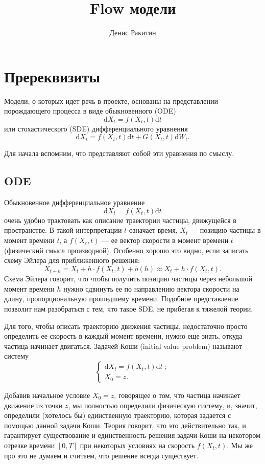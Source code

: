 \documentclass[12pt]{article}
\title{Flow модели}
\theoremstyle{definition}
\begin{document}
\author{Денис Ракитин}
\date{}
\maketitle
\tableofcontents
\newpage

\section{Пререквизиты}


Модели, о которых идет речь в проекте, основаны на представлении порождающего процесса в виде обыкновенного (ODE)
\[
    \mathrm{d} X_t = f(X_t, t) \mathrm{d} t
\]
или стохастического (SDE) дифференциального уравнения
\[
    \mathrm{d} X_t = f(X_t, t) \mathrm{d} t + G(X_t, t) \mathrm{d} W_t.
\]

Для начала вспомним, что представляют собой эти уравнения по смыслу. 

\subsection{ODE}
Обыкновенное дифференциальное уравнение 
\[
    \mathrm d X_t = f(X_t, t) \mathrm{d} t
\]
очень удобно трактовать как описание траектории частицы, движущейся в пространстве. В такой интерпретации $t$ означает время, $X_t$ --- позицию частицы в момент времени $t$, а $f(X_t, t)$ --- ее вектор скорости в момент времени $t$ (физический смысл производной). Особенно хорошо это видно, если записать схему Эйлера для приближенного решения:
\[
    X_{t + h} = X_t + h \cdot f(X_t, t) + \overline{o}(h) \approx X_t + h \cdot f(X_t, t).
\]
Схема Эйлера говорит, что чтобы получить позицию частицы через небольшой момент времени $h$ нужно сдвинуть ее по направлению вектора скорости на длину, пропорциональную прошедшему времени. Подобное представление позволит нам разобраться с тем, что такое SDE, не прибегая к тяжелой теории.

Для того, чтобы описать траекторию движения частицы, недостаточно просто определить ее скорость в каждый момент времени, нужно еще знать, откуда частица начинает двигаться. Задачей Коши (initial value problem) называют систему
\[
    \begin{cases}
        \mathrm{d} X_t = f(X_t, t) \mathrm{d} t\:;\\
        X_0 = z.
    \end{cases}
\]

Добавив начальное условие $X_0 = z$, говорящее о том, что частица начинает движение из точки $z$, мы полностью определили физическую систему, и, значит, определили (хотелось бы) единственную траекторию, которая задается с помощью данной задачи Коши. Теория говорит, что это действительно так, и гарантирует существование и единственность решения задачи Коши на некотором отрезке времени $[0, T]$ при некоторых условиях на скорость $f(X_t, t)$. Мы же про это не думаем и считаем, что решение всегда существует.
\end{document}

